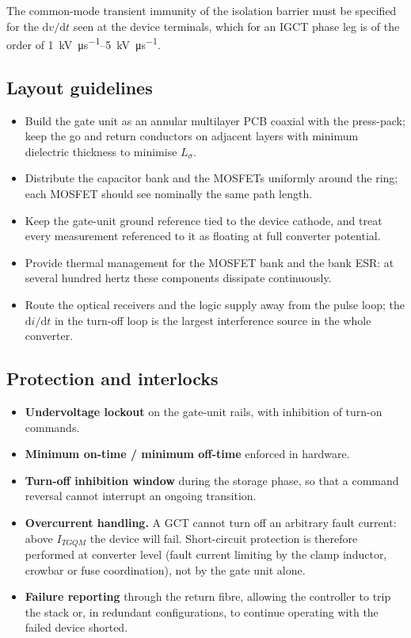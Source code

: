 The common-mode transient immunity of the isolation barrier must be specified for
the $\mathrm{d}v/\mathrm{d}t$ seen at the device terminals, which for an IGCT
phase leg is of the order of \SIrange{1}{5}{\kilo\volt\per\micro\second}.

\subsection{Layout guidelines}

\begin{itemize}[nosep]
  \item Build the gate unit as an annular multilayer PCB coaxial with the
        press-pack; keep the go and return conductors on adjacent layers with
        minimum dielectric thickness to minimise $L_{\sigma}$.
  \item Distribute the capacitor bank and the MOSFETs uniformly around the ring;
        each MOSFET should see nominally the same path length.
  \item Keep the gate-unit ground reference tied to the device cathode, and treat
        every measurement referenced to it as floating at full converter
        potential.
  \item Provide thermal management for the MOSFET bank and the bank ESR: at
        several hundred hertz these components dissipate continuously.
  \item Route the optical receivers and the logic supply away from the pulse
        loop; the $\mathrm{d}i/\mathrm{d}t$ in the turn-off loop is the largest
        interference source in the whole converter.
\end{itemize}

\subsection{Protection and interlocks}

\begin{itemize}[nosep]
  \item \textbf{Undervoltage lockout} on the gate-unit rails, with inhibition of
        turn-on commands.
  \item \textbf{Minimum on-time / minimum off-time} enforced in hardware.
  \item \textbf{Turn-off inhibition window} during the storage phase, so that a
        command reversal cannot interrupt an ongoing transition.
  \item \textbf{Overcurrent handling.} A GCT cannot turn off an arbitrary fault
        current: above $I_{TGQM}$ the device will fail. Short-circuit protection
        is therefore performed at converter level (fault current limiting by the
        clamp inductor, crowbar or fuse coordination), not by the gate unit
        alone.
  \item \textbf{Failure reporting} through the return fibre, allowing the
        controller to trip the stack or, in redundant configurations, to continue
        operating with the failed device shorted.
\end{itemize}

